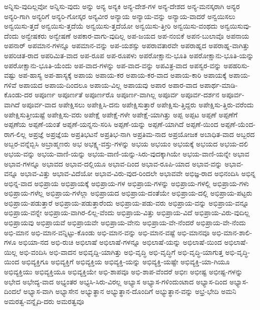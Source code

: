 {ಅನ್ನಿಸು-ವುದಿಲ್ಲವೋ
ಅನ್ನಿಸು-ವುದು
ಅನ್ನು
ಅನ್ಯ
ಅನ್ಯಕಿ
ಅನ್ಯ-ದೇಶ-ಗಳ
ಅನ್ಯ-ದೇಶದ
ಅನ್ಯ-ಮನಸ್ಕರಾಗಿ
ಅನ್ಯರ
ಅನ್ಯರಿ-ಗಾಗಿ
ಅನ್ಯರಿಗೆ
ಅನ್ಯರಿ-ಗೋಸ್ಕರ
ಅನ್ಯವೀರ
ಅನ್ಯಾಯ
ಅನ್ಯಾಯ-ವನ್ನು
ಅನ್ಯಾಯ-ವಾದರೆ
ಅನ್ವಯಿಸಲು
ಅನ್ವಯಿಸು-ತ್ತದೆ
ಅನ್ವಯಿಸು-ತ್ತದೆಯೆ
ಅನ್ವಯಿಸು-ತ್ತದೆಯೋ
ಅನ್ವಯಿಸು-ತ್ತೀರಿ
ಅನ್ವಯಿಸು-ವಂಥದು
ಅನ್ವಯಿಸುವು-ದೆಂದು
ಅನ್ವೇಷಕರು
ಅನ್ವೇಷಣೆ
ಅಪಕಾರ-ವಾಗು-ವುದಿಲ್ಲ
ಅಪ-ಜಯದ
ಅಪ-ನಂಬಿಕೆ
ಅಪನ-ಬುಲಾವೊ
ಅಪನಾಯ
ಅಪನಾರ್
ಅಪಮಾನ-ಗಳನ್ನೂ
ಅಪಮಾನ-ವನ್ನು
ಅಪ-ಯಶಸ್ಸು
ಅಪರಾವತಾರವೇ
ಅಪರಾಹ್ನದ
ಅಪರಾಹ್ನ-ವಾಗಿತ್ತು
ಅಪರಿಚಿತ-ರಾದ
ಅಪರಿಮಿತ-ವಾದ
ಅಪ-ರೂಪ
ಅಪ-ರೂಪಳು
ಅಪರೋಕ್ಷಾನು-ಭೂತಿ
ಅಪರೋಕ್ಷಾನು-ಭೂತಿ-ಯನ್ನು
ಅಪರೋಕ್ಷಾನು-ಭೂತಿ-ಯೆಂದು
ಅಪ-ವಾದ-ಗಳನ್ನು
ಅಪ-ವಾದ-ವನ್ನು
ಅಪವಿತ್ರ-ವಾದ
ಅಪಸ್ವರ-ವನ್ನು
ಅಪಹರಿಸು-ವಷ್ಟು
ಅಪ-ಹಾಸ್ಯ
ಅಪ-ಹಾಸ್ಯಕ್ಕೆ
ಅಪಾಯ
ಅಪಾಯ-ಕರ
ಅಪಾಯ-ಕರ-ವಾದ
ಅಪಾಯ-ಕಾರಿ
ಅಪಾಯಕ್ಕೆ
ಅಪಾಯ-ಗಳಿವೆ
ಅಪಾಯದ
ಅಪಾಯ-ದಿಂದಲೂ
ಅಪಾಯ-ವಿಲ್ಲ
ಅಪಾಯವು
ಅಪಾರ
ಅಪಾರ-ವಾದ
ಅಪಾರ್ಥ-ಮಾಡಿ-ಕೊಂಡು-ದರ
ಅಪೂರ್ಣ
ಅಪೂರ್ಣತೆ
ಅಪೂರ್ಣರೊ
ಅಪೂರ್ಣ-ವಾಗಿಲ್ಲ
ಅಪೂರ್ವ
ಅಪೂರ್ವ-ದರ್ಶನ
ಅಪೂರ್ವ-ವಾಗಿದೆ
ಅಪೂರ್ವ-ವಾದ
ಅಪೇಕ್ಷಿಸಲು
ಅಪೇಕ್ಷಿಸಿ-ದನು
ಅಪೇಕ್ಷಿಸುತ್ತಾರೆ
ಅಪೇಕ್ಷಿಸು-ತ್ತಿದ್ದರು
ಅಪೇಕ್ಷಿಸು-ತ್ತಿರು-ವರೆಂದು
ಅಪೇಕ್ಷಿಸುತ್ತೀಯಷ್ಟೆ
ಅಪೇಕ್ಷಿಸು-ವರು
ಅಪೇಕ್ಷೆ
ಅಪೇಕ್ಷೆ-ಗಳೇ
ಅಪೇಕ್ಷೆ-ಯಾಗಿತ್ತು
ಅಪ್ಪ
ಅಪ್ಪಟ
ಅಪ್ಪಣೆ
ಅಪ್ಪಣೆಗೆ
ಅಪ್ಪಣೆಯ
ಅಪ್ಪಣೆ-ಯಂತೆ
ಅಪ್ಪಣೆ-ಯನ್ನನು-ಸರಿಸಿ
ಅಪ್ಪಣೆ-ಯನ್ನು
ಅಪ್ಪಣೆ-ಯಾಗಿದೆ
ಅಪ್ಪಣೆ-ಯಿಂದ
ಅಪ್ಪಣೆ-ಯೆಂದ-ರಾಗ-ಲಿಲ್ಲ
ಅಪ್ರಜ್ಞೆ
ಅಪ್ರಜ್ಞೆಯ
ಅಪ್ರತಿಭಟನೆ
ಅಪ್ರತಿಭ-ನಾಗಿ
ಅಪ್ರತಿಮ-ನಾದ
ಅಪ್ರಯೋಜಕ
ಅಬಾಧಿತ-ವಾದ
ಅಬ್ಬರದ
ಅಬ್ಬರ-ವನ್ನೆಬ್ಬಿಸಿ
ಅಬ್ರಾಹ್ಮಣರು
ಅಭ
ಅಭಕ್ಷ್ಯ-ವಸ್ತು-ಗಳನ್ನು
ಅಭಯ
ಅಭಯಂ
ಅಭಯಕ್ಕೆ
ಅಭಯದ
ಅಭಯ-ದಲಿ
ಅಭಯ-ವನ್ನು
ಅಭಯ-ವಾಣಿ-ಯನ್ನು
ಅಭಯ-ವಾಣಿ-ಯನ್ನು-ಸಿರು-ವುದಕ್ಕಾಗಿಯೇ
ಅಭಯ-ವಾಣಿ-ಯನ್ನೇ
ಅಭಾವ
ಅಭಾವ-ಗಳನ್ನೂ
ಅಭಾವದ
ಅಭಾವ-ದಲ್ಲಿಯೂ
ಅಭಾವ-ದಿಂದ
ಅಭಾವ-ರೂಪಿ-ಯಾದ
ಅಭಾವ-ವನ್ನು
ಅಭಾವ-ವನ್ನೂ
ಅಭಾವ-ವಿತ್ತು
ಅಭಾವ-ವಿದೆಯೋ
ಅಭಾವ-ವಿರು-ವುದ-ರಿಂದಲೇ
ಅಭಾವವೇ
ಅಭಿಜ್ಞ-ರಾದ
ಅಭಿನಂದಿಸಿ
ಅಭಿನ್ನ
ಅಭಿನ್ನ-ವಾದ
ಅಭಿಪ್ರಾಯ
ಅಭಿಪ್ರಾಯಕ್ಕೆ
ಅಭಿಪ್ರಾಯ-ಗಳ
ಅಭಿಪ್ರಾಯ-ಗಳನ್ನು
ಅಭಿಪ್ರಾಯ-ಗಳಲ್ಲಿ
ಅಭಿಪ್ರಾಯ-ಗಳು
ಅಭಿಪ್ರಾಯ-ಗಳೆಲ್ಲ
ಅಭಿಪ್ರಾಯ-ಗಳೆಲ್ಲಾ
ಅಭಿಪ್ರಾಯದ
ಅಭಿಪ್ರಾಯ-ದಂತೆಯೇ
ಅಭಿಪ್ರಾಯ-ದಲ್ಲಿ
ಅಭಿಪ್ರಾಯ-ಪಟ್ಟರು
ಅಭಿಪ್ರಾಯ-ಪಡುತ್ತಾರೆ
ಅಭಿಪ್ರಾಯ-ಪಡುತ್ತಾರೆಂದು
ಅಭಿಪ್ರಾಯ-ಪಡು-ವರು
ಅಭಿಪ್ರಾಯ-ವನ್ನು
ಅಭಿಪ್ರಾಯ-ವನ್ನೂ
ಅಭಿಪ್ರಾಯ-ವನ್ನೇ
ಅಭಿಪ್ರಾಯ-ವಾಗಿರ-ಲಿಲ್ಲ-ವೆಂದು
ಅಭಿಪ್ರಾಯ-ವಿತ್ತು
ಅಭಿಪ್ರಾಯ-ವಿದೆ
ಅಭಿಪ್ರಾಯ-ವಿರು-ವುದಿಲ್ಲ
ಅಭಿಪ್ರಾಯವು
ಅಭಿಪ್ರಾಯವೆ
ಅಭಿಪ್ರಾಯವೇ
ಅಭಿಪ್ರಾಯ-ವೇನು
ಅಭಿಪ್ರಾಯ-ವೇ-ನೆಂದರೆ
ಅಭಿಪ್ರಾಯ-ವೇ-ನೆಂದು
ಅಭಿ-ಮಾನ
ಅಭಿ-ಮಾನ-ವನ್ನಿಟ್ಟು-ಕೊಂಡು
ಅಭಿ-ಮಾನ-ವನ್ನು
ಅಭಿ-ಮಾನ-ವಷ್ಟೆ
ಅಭಿ-ಮಾನವೂ
ಅಭಿ-ಮಾನ-ಶಾಲಿ-ಗಳೂ
ಅಭಿಯಾ-ನದ
ಅಭಿ-ರುಚಿ
ಅಭಿಲಾಷೆ
ಅಭಿಲಾಷೆ-ಗಳನ್ನೂ
ಅಭಿಲಾಷೆ-ಯನ್ನು
ಅಭಿಲಾಷೆ-ಯಿಂದ
ಅಭಿಲಾಷೆ-ಯಿಲ್ಲ
ಅಭಿ-ವಂದಿಸಿ
ಅಭಿ-ವಾದನ
ಅಭಿವೃದ್ದಿ-ಯಾಗಿತ್ತು
ಅಭಿ-ವೃದ್ಧಿ
ಅಭಿ-ವೃದ್ಧಿಗೆ
ಅಭಿ-ವೃದ್ಧಿ-ಯಾಗುತ್ತ
ಅಭಿ-ವೃದ್ಧಿ-ಯಿಂದ
ಅಭಿವ್ಯಕ್ತಿಗೂ
ಅಭಿವ್ಯಕ್ತಿಗೆ
ಅಭಿವ್ಯಕ್ತಿಯ
ಅಭಿವ್ಯಕ್ತಿ-ಯನ್ನು
ಅಭಿವ್ಯಕ್ತಿ-ಯಷ್ಟೇ
ಅಭಿವ್ಯಕ್ತಿ-ಯಾ-ಗಿಯೂ
ಅಭಿವ್ಯಕ್ತಿಯು
ಅಭಿವ್ಯಕ್ತಿಯೂ
ಅಭಿವ್ಯಕ್ತಿಯೇ
ಅಭಿ-ಶಾಪವೂ
ಅಭಿ-ಶಾಪ-ವೆಂದರೆ
ಅಭೀಃ
ಅಭೀಷ್ಟ
ಅಭೀಷ್ಟ-ಗಳನ್ನು
ಅಭೇದ
ಅಭೇದ್ಯ-ವಾದ
ಅಭ್ಯಂತರ
ಅಭ್ಯಸಿ-ಸಿರು-ವಿರಲ್ಲ
ಅಭ್ಯಾಸ
ಅಭ್ಯಾಸ-ಗಳಿಂದುಂಟಾದ
ಅಭ್ಯಾಸ-ದಿಂದ
ಅಭ್ಯಾಸ-ದಿಂದಲೆ
ಅಭ್ಯಾಸ-ವಾಗಿ
ಅಭ್ಯಾಸೇನ
ಅಭ್ಯುತ್ಥಾನ
ಅಭ್ಯುತ್ಥಾನ-ದೊಂದಿಗೆ
ಅಭ್ಯುತ್ಥಾನ-ವನ್ನು
ಅಭ್ರ-ಭೇದಿ
ಅಮನಿ
ಅಮರತ್ವ-ವನ್ನೈದಿ-ದರು
ಅಮರತ್ವವೂ
}
